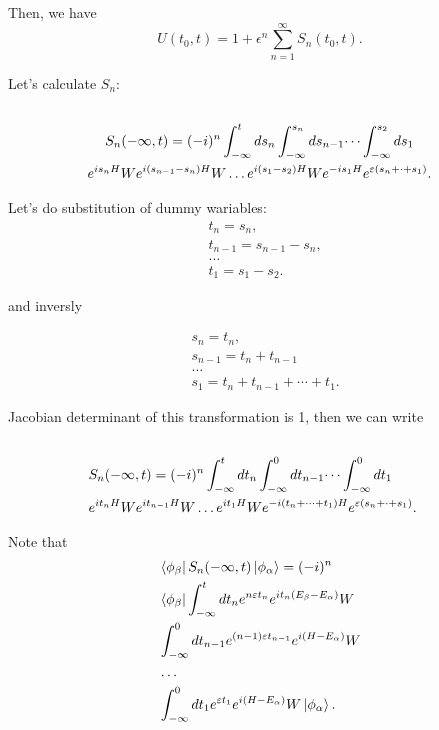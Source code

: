 \documentclass[main.tex]{subfiles}
\begin{document}
Then, we have
\begin{equation}
U(t_0, t) = 1 + \epsilon^n \sum_{n=1}^\infty S_n (t_0, t).
\end{equation}

Let's calculate $S_n$:
\begin{multline}\\
S_n(-\infty, t) = (-i)^n \int_{-\infty}^t ds_n \int_{-\infty}^{s_n} ds_{n - 1}\dots \int_{-\infty}^{s_2} ds_1\\
e^{is_nH}We^{i(s_{n-1} - s_n)H}W \dots e^{i(s_1 - s_2)H}We^{-is_1H}e^{\eepsilon(s_n + \cdot + s_1)}.
\end{multline}

Let's do substitution of dummy wariables:
\begin{align*}
&t_n = s_n,\\
&t_{n-1} = s_{n-1} - s_n,\\
&\dots\\
&t_1 = s_1 - s_2.
\end{align*} 

and inversly

\begin{align*}
&s_n =t_n,\\
&s_{n-1} = t_n + t_{n-1}\\
&\dots\\
&s_1 = t_n + t_{n-1} + \cdots + t_1.
\end{align*}

Jacobian determinant of this transformation is 1, then we can write
\begin{align*}\\
&S_n(-\infty, t) = (-i)^n \int_{-\infty}^t dt_n \int_{-\infty}^{0} dt_{n - 1}\dots \int_{-\infty}^{0} dt_1\\
&e^{it_nH}We^{it_{n-1}H}W \dots e^{it_1H}We^{-i(t_n + \cdots + t_1)H}e^{\eepsilon(s_n + \cdot + s_1)}.
\end{align*}

Note that
\begin{align*}
&\bra{\phi_\beta}S_n (-\infty, t) \ket{\phi_\alpha} = (-i)^n \\
& \bra{\phi_\beta} \int^t_{-\infty} dt_n e^{n\eepsilon t_{n}} e^{it_n(E_{\beta} - E_{\alpha})} W\\
& \int^0_{-\infty}dt_{n-1} e^{(n - 1)\eepsilon t_{n - 1}}e^{i(H - E_\alpha)} W\\
& \dots \\
&\int^0_{-\infty}dt_{1} e^{\eepsilon t_1}e^{i(H - E_\alpha)} W \ket{\phi_\alpha}.
\end{align*} 
\end{document}
